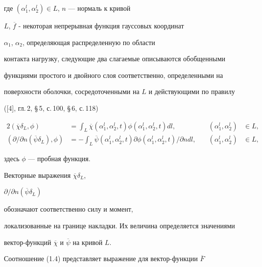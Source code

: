 где $(\alpha_{1}^{l},\alpha_{2}^{l}) \in L$, $n$ --- нормаль к кривой


$L$, $\overline f$ - некоторая непрерывная функция гауссовых координат


$\alpha_{1}$, $\alpha_{2}$, определяющая распределенную по области


контакта нагрузку, следующие два слагаемые описываются обобщенными


функциями простого и двойного слоя соответственно, определенными на


поверхности оболочки, сосредоточенными на $L$ и действующими по правилу


([4], гл.\,2, \S\,5, с.\,100, \S\,6, с.\,118)


\begin{alignat*}{2}


(\overline{\chi}\delta_{L},\phi)&=


\int_{L} \overline{\chi}(\alpha_{1}^{l},\alpha_{2}^{l},t)


\phi(\alpha_{1}^{l},\alpha_{2}^{l},t)dl,


&\quad (\alpha_{1}^{l},\alpha_{2}^{l})&\in L, \\


%


(\partial/\partial n(\overline{\psi}\delta_{L}),\phi)&=


-\int_{L} \overline{\psi}(\alpha_{1}^{l},\alpha_{2}^{l},t)


\partial\phi(\alpha_{1}^{l},\alpha_{2}^{l},t)/


\partial n dl,


&\quad (\alpha_{1}^{l},\alpha_{2}^{l})&\in L,


\end{alignat*}


здесь $\phi$ --- пробная функция.





Векторные выражения $\overline{\chi} \delta_{L}$,


$\partial/\partial n(\overline{\psi}\delta_{L})$


обозначают соответственно силу и момент,


локализованные на границе накладки. Их величина определяется значениями


вектор-функций $\overline{\chi}$ и $\overline{\psi}$ на кривой $L$.





Соотношение (1.4) представляет выражение для вектор-функции $\overline F$


